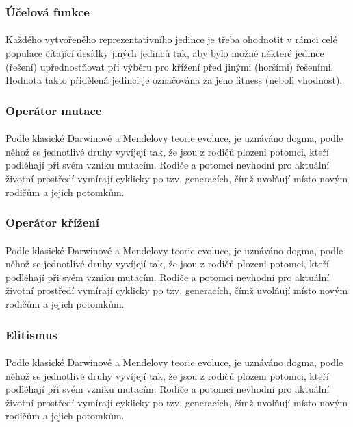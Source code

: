 \documentclass[bc,male,java,dept460]{diploma}		%
\begin{document}
\subsubsection{Účelová funkce}
\paragraph*{}
Každého vytvořeného reprezentativního jedince je třeba ohodnotit v rámci celé populace čítající desídky jiných jedinců tak, aby bylo možné některé jedince (řešení) upřednostňovat při výběru pro křížení před jinými (horšími) řešeními.
Hodnota takto přidělená jedinci je označována za jeho fitness (neboli vhodnost).

\subsubsection{Operátor mutace}
\paragraph*{}
Podle klasické Darwinové a Mendelovy teorie evoluce, je uznáváno dogma, podle něhož se jednotlivé druhy vyvíjejí tak, že jsou z rodičů plozeni potomci, kteří podléhají při svém vzniku mutacím. Rodiče a potomci nevhodní pro aktuální životní prostředí vymírají cyklicky po tzv. generacích, čímž uvolňují místo novým rodičům a jejich potomkům.

\subsubsection{Operátor křížení}
\paragraph*{}
Podle klasické Darwinové a Mendelovy teorie evoluce, je uznáváno dogma, podle něhož se jednotlivé druhy vyvíjejí tak, že jsou z rodičů plozeni potomci, kteří podléhají při svém vzniku mutacím. Rodiče a potomci nevhodní pro aktuální životní prostředí vymírají cyklicky po tzv. generacích, čímž uvolňují místo novým rodičům a jejich potomkům.

\subsubsection{Elitismus}
\paragraph*{}
Podle klasické Darwinové a Mendelovy teorie evoluce, je uznáváno dogma, podle něhož se jednotlivé druhy vyvíjejí tak, že jsou z rodičů
plozeni potomci, kteří podléhají při svém vzniku mutacím. Rodiče a potomci nevhodní pro aktuální životní prostředí vymírají cyklicky po tzv. generacích, čímž uvolňují místo novým rodičům a jejich potomkům.
\end{document}
